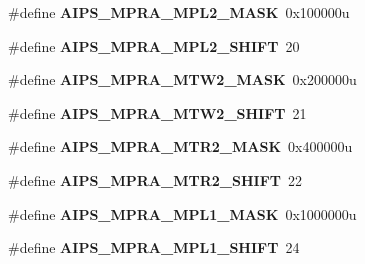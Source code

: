 \begin{DoxyCompactItemize}
\item 
\hypertarget{group___a_i_p_s___register___masks_ga6fa61f1f86b84741e5a4e3484a3906d6}{}\#define {\bfseries A\+I\+P\+S\+\_\+\+M\+P\+R\+A\+\_\+\+M\+P\+L2\+\_\+\+M\+A\+S\+K}~0x100000u\label{group___a_i_p_s___register___masks_ga6fa61f1f86b84741e5a4e3484a3906d6}

\item 
\hypertarget{group___a_i_p_s___register___masks_ga09c44f94729b70aab309dcbbd100071d}{}\#define {\bfseries A\+I\+P\+S\+\_\+\+M\+P\+R\+A\+\_\+\+M\+P\+L2\+\_\+\+S\+H\+I\+F\+T}~20\label{group___a_i_p_s___register___masks_ga09c44f94729b70aab309dcbbd100071d}

\item 
\hypertarget{group___a_i_p_s___register___masks_ga22f665d4b34bc36d18f7840834c2d8ec}{}\#define {\bfseries A\+I\+P\+S\+\_\+\+M\+P\+R\+A\+\_\+\+M\+T\+W2\+\_\+\+M\+A\+S\+K}~0x200000u\label{group___a_i_p_s___register___masks_ga22f665d4b34bc36d18f7840834c2d8ec}

\item 
\hypertarget{group___a_i_p_s___register___masks_gacba4e2743a846f34382eb36a1b5b96fb}{}\#define {\bfseries A\+I\+P\+S\+\_\+\+M\+P\+R\+A\+\_\+\+M\+T\+W2\+\_\+\+S\+H\+I\+F\+T}~21\label{group___a_i_p_s___register___masks_gacba4e2743a846f34382eb36a1b5b96fb}

\item 
\hypertarget{group___a_i_p_s___register___masks_ga2f0788074eb8af6b49e1e4731657d51d}{}\#define {\bfseries A\+I\+P\+S\+\_\+\+M\+P\+R\+A\+\_\+\+M\+T\+R2\+\_\+\+M\+A\+S\+K}~0x400000u\label{group___a_i_p_s___register___masks_ga2f0788074eb8af6b49e1e4731657d51d}

\item 
\hypertarget{group___a_i_p_s___register___masks_ga3d422270654f5185914f5f7e3956242b}{}\#define {\bfseries A\+I\+P\+S\+\_\+\+M\+P\+R\+A\+\_\+\+M\+T\+R2\+\_\+\+S\+H\+I\+F\+T}~22\label{group___a_i_p_s___register___masks_ga3d422270654f5185914f5f7e3956242b}

\item 
\hypertarget{group___a_i_p_s___register___masks_ga5b89cb1cc59abd5339afd1a1f01e3ee4}{}\#define {\bfseries A\+I\+P\+S\+\_\+\+M\+P\+R\+A\+\_\+\+M\+P\+L1\+\_\+\+M\+A\+S\+K}~0x1000000u\label{group___a_i_p_s___register___masks_ga5b89cb1cc59abd5339afd1a1f01e3ee4}

\item 
\hypertarget{group___a_i_p_s___register___masks_gae0eb7bf97dc1d63e94c93c7f6f690785}{}\#define {\bfseries A\+I\+P\+S\+\_\+\+M\+P\+R\+A\+\_\+\+M\+P\+L1\+\_\+\+S\+H\+I\+F\+T}~24\label{group___a_i_p_s___register___masks_gae0eb7bf97dc1d63e94c93c7f6f690785}


\end{DoxyCompactItemize}
